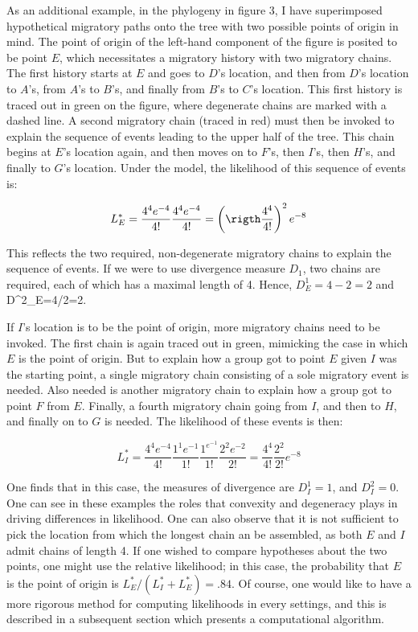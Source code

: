 \documentclass[11pt]{article}
\begin{document}
{As an additional example, in the phylogeny in figure 3, I have superimposed hypothetical migratory paths{} onto the tree with two possible points of origin in mind. The point of origin of the left-hand component of the figure is posited to be point $E$, which necessitates a migratory history with two migratory chains.  The first history starts at $E$ and goes to $D$'s location, and then from $D$'s location to $A$'s, from $A$'s to $B$'s, and finally from $B$'s to $C$'s location. This first history is traced out in green on the figure, where degenerate  chains are marked with a dashed line. A second migratory chain (traced in red) must then be invoked to explain the sequence of events leading to the upper half of the tree. This chain begins at $E$'s location again, and then moves on to $F$'s, then $I$'s, then $H$'s, and finally to $G$'s location. Under the model, the likelihood of this sequence of events is:

\begin{equation*}
L^*_E =  \frac{4^4e^{-4}}{4!}\frac{4^4e^{-4}}{4!} =\left(\rigth\frac{4^4}{4!}\right)^2e^{-8}
\end{equation*}

This reflects the two required, non-degenerate migratory chains to explain the sequence of events.  If we were to use divergence measure $D_1$, two chains are required, each of which has a maximal length of 4. Hence, $D^1_E=4-2=2$ and D^2_E=4/2=2.

If $I$'s location is  to be the point of origin, more migratory chains need to be invoked. The first chain is again traced out in green, mimicking the case in which $E$ is the point of origin. But to explain how a group got to point $E$ given $I$ was the starting point, a single migratory chain consisting of a sole migratory event is needed. Also needed is another migratory chain to explain how a group got to point $F$ from $E$. Finally, a fourth migratory chain going from $I$, and then to $H$, and finally on to $G$ is needed. The likelihood of these events is then:

\begin{equation*}
L^*_I =\frac{4^4e^{-4}}{4!}\frac{1^1e^{-1}}{1!}\frac{1^e^{-1}}{1!}\frac{2^2e^{-2}}{2!}=\frac{4^4}{4!}\frac{2^2}{2!}e^{-8}
\end{equation*} 

One finds that in this case, the measures of divergence are $D_I^1=1$, and $D^2_I
=0$. One can see in these examples the roles that convexity and degeneracy plays in driving differences in likelihood. One can also observe that it is not sufficient to pick the location from which the longest chain an be assembled, as both $E$ and $I$ admit chains of length 4. 
If one wished to compare hypotheses about the two points, one might use the relative likelihood; in this case, the probability that $E$ is the point of origin is $L^*_E/(L^*_I+L^*_E)
=.84.$ Of course, one would like to have a more rigorous method for computing likelihoods in every settings, and this is described in a subsequent section which presents a computational algorithm.  

}
\end{document}
